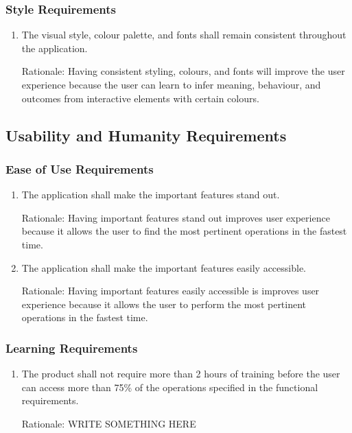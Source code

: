 \documentclass{article}
\begin{document}
\subsubsection{Style Requirements}
\begin{enumerate}[STR1]
    \item The visual style, colour palette, and fonts shall remain consistent throughout the application.

	Rationale: Having consistent styling, colours, and fonts will improve the user experience because the user can learn to infer meaning, behaviour, and outcomes from interactive elements with certain colours.
\end{enumerate}

\subsection{Usability and Humanity Requirements}
\subsubsection{Ease of Use Requirements}
\begin{enumerate}[EUR1]
    \item The application shall make the important features stand out.

	Rationale: Having important features stand out improves user experience because it allows the user to find the most pertinent operations in the fastest time.
    \item The application shall make the important features easily accessible.

	Rationale: Having important features easily accessible is improves user experience because it allows the user to perform the most pertinent operations in the fastest time.
\end{enumerate}

\subsubsection{Learning Requirements}
\begin{enumerate}[LER1]
    \item The product shall not require more than 2 hours of training before the user can access more than 75\% of the operations specified in the functional requirements.
	
	Rationale: WRITE SOMETHING HERE
\end{enumerate}
\end{document}
